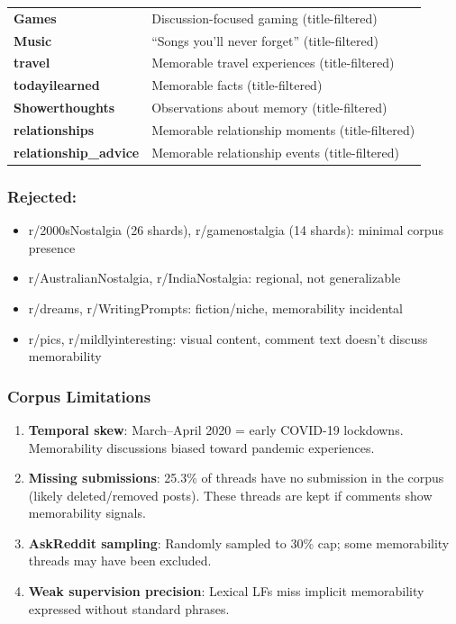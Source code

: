 \begin{table}[h]
\begin{tabular}{|l|l|}
\textbf{Games} & Discussion-focused gaming (title-filtered) \\
\textbf{Music} & ``Songs you'll never forget'' (title-filtered) \\
\textbf{travel} & Memorable travel experiences (title-filtered) \\
\textbf{todayilearned} & Memorable facts (title-filtered) \\
\textbf{Showerthoughts} & Observations about memory (title-filtered) \\
\textbf{relationships} & Memorable relationship moments (title-filtered) \\
\textbf{relationship\_advice} & Memorable relationship events (title-filtered) \\
\hline
\end{tabular}
\end{table}

\subsubsection*{Rejected:}
\begin{itemize}
    \item r/2000sNostalgia (26 shards), r/gamenostalgia (14 shards): minimal corpus presence
    \item r/AustralianNostalgia, r/IndiaNostalgia: regional, not generalizable
    \item r/dreams, r/WritingPrompts: fiction/niche, memorability incidental
    \item r/pics, r/mildlyinteresting: visual content, comment text doesn't discuss memorability
\end{itemize}

\subsubsection{Corpus Limitations}
\begin{enumerate}
    \item \textbf{Temporal skew}: March--April 2020 = early COVID-19 lockdowns. Memorability discussions biased toward pandemic experiences.
    \item \textbf{Missing submissions}: 25.3\% of threads have no submission in the corpus (likely deleted/removed posts). These threads are kept if comments show memorability signals.
    \item \textbf{AskReddit sampling}: Randomly sampled to 30\% cap; some memorability threads may have been excluded.
    \item \textbf{Weak supervision precision}: Lexical LFs miss implicit memorability expressed without standard phrases.
\end{enumerate}

